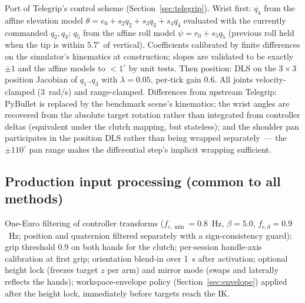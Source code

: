 Port of Telegrip's control scheme (Section~\ref{sec:telegrip}). Wrist
first: \(q_4\) from the affine elevation model
\(\theta = e_0 + s_2 q_2 + s_3 q_3 + s_4 q_4\) evaluated with the currently
commanded \(q_2, q_3\); \(q_5\) from the affine roll model
\(\psi = r_0 + s_5 q_5\) (previous roll held when the tip is within
\(5.7^\circ\) of vertical). Coefficients calibrated by finite differences
on the simulator's kinematics at construction; slopes are validated to be
exactly \(\pm1\) and the affine models to \(<1^\circ\) by unit tests.
Then position: DLS on the \(3\times3\) position Jacobian of
\(q_1..q_3\) with \(\lambda=0.05\), per-tick gain 0.6. All joints
velocity-clamped (3~rad/s) and range-clamped. Differences from upstream
Telegrip: PyBullet is replaced by the benchmark scene's kinematics; the
wrist angles are recovered from the absolute target rotation rather than
integrated from controller deltas (equivalent under the clutch mapping,
but stateless); and the shoulder pan participates in the position DLS
rather than being wrapped separately~--- the \(\pm110^\circ\) pan range
makes the differential step's implicit wrapping sufficient.

\subsection{Production input processing (common to all methods)}

One-Euro filtering of controller transforms
(\(f_{c,\min}=0.8\)~Hz, \(\beta=5.0\), \(f_{c,d}=0.9\)~Hz; position and
quaternion filtered separately with a sign-consistency guard); grip
threshold 0.9 on both hands for the clutch; per-session handle-axis
calibration at first grip; orientation blend-in over 1~s after activation;
optional height lock (freezes target \(z\) per arm) and mirror mode (swaps
and laterally reflects the hands); workspace-envelope policy
(Section~\ref{sec:envelope}) applied after the height lock, immediately
before targets reach the IK.
